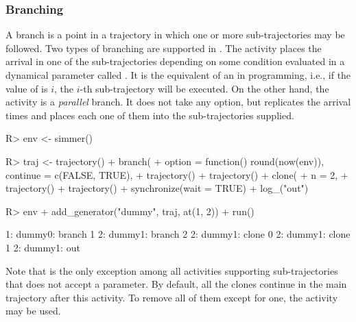\documentclass[
  nojss]{jss}
\begin{document}
\hypertarget{branching}{%
\subsubsection{Branching}\label{branching}}

A branch is a point in a trajectory in which one or more
sub-trajectories may be followed. Two types of branching are supported
in . The  activity places the arrival in one
of the sub-trajectories depending on some condition evaluated in a
dynamical parameter called . It is the equivalent of an
 in programming, i.e., if the value of  is
\(i\), the \(i\)-th sub-trajectory will be executed. On the other hand,
the  activity is a \emph{parallel} branch. It does not
take any option, but replicates the arrival  times and places
each one of them into the  sub-trajectories supplied.

\begin{CodeChunk}
\begin{CodeInput}
R> env <- simmer()
\end{CodeInput}
\end{CodeChunk}

\begin{CodeChunk}
\begin{CodeInput}
R> traj <- trajectory() %
+   branch(
+     option = function() round(now(env)), continue = c(FALSE, TRUE),
+     trajectory() %
+     trajectory() %
+   clone(
+     n = 2,
+     trajectory() %
+     trajectory() %
+   synchronize(wait = TRUE) %
+   log_("out")
\end{CodeInput}
\end{CodeChunk}

\begin{CodeChunk}
\begin{CodeInput}
R> env %
+   add_generator("dummy", traj, at(1, 2)) %
+   run() %
\end{CodeInput}
\begin{CodeOutput}
1: dummy0: branch 1
2: dummy1: branch 2
2: dummy1: clone 0
2: dummy1: clone 1
2: dummy1: out
\end{CodeOutput}
\end{CodeChunk}

Note that  is the only exception among all activities
supporting sub-trajectories that does not accept a 
parameter. By default, all the clones continue in the main trajectory
after this activity. To remove all of them except for one, the
 activity may be used.
\end{document}
